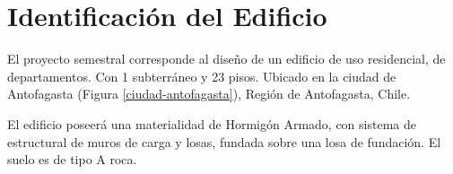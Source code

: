 \section{Identificación del Edificio}

El proyecto semestral corresponde al diseño de un edificio de uso residencial, de departamentos. Con 1 subterráneo y 23 pisos. Ubicado en la ciudad de Antofagasta (Figura \ref{ciudad-antofagasta}), Región de Antofagasta, Chile.


El edificio poseerá una materialidad de Hormigón Armado, con sistema de estructural de muros de carga y losas, fundada sobre una losa de fundación. El suelo es de tipo A roca.